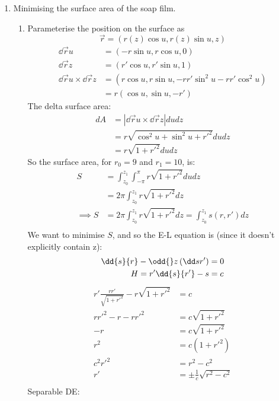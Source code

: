 \documentclass{X:/Documents/Coding/Latex/myassignment}
\begin{document}
\begin{enumerate}
\item Minimising the surface area of the soap film.
\begin{enumerate}
	\item Parameterise the position on the surface as
	\[\vec r = \left(r(z)\cos u, r(z)\sin u, z\right)\]
	\begin{align*}
		\dd{\vec r}{u} &= \left(-r\sin u, r \cos u, 0\right)\\
		\dd{\vec r}{z} &= \left(r'\cos u, r'\sin u,1\right)\\
		\dd{\vec r}{u} \times \dd{\vec r}{z} &= \left(r\cos u, r\sin u, -rr' \sin^2 u - rr' \cos^2 u\right)\\
		&=r(\cos u, \sin u, -r')
	\end{align*}
	The delta surface area:
	\begin{align*}
		dA &= \left|\dd{\vec r}{u} \times \dd{\vec r}{z}\right| du dz\\
		&= r\sqrt{\cos^2 u + \sin^2 u + r'^2} du dz\\
		&= r \sqrt{1 + r'^2} du dz
	\end{align*}
	So the surface area, for $r_0 = 9$ and $r_1 = 10$, is: 
	\begin{align*}
		S &= \int_{z_0}^{z_1} \int_{-\pi}^{\pi}  r \sqrt{1 + r'^2} du dz\\
		&= 2\pi \int_{z_0}^{z_1}  r \sqrt{1 + r'^2} dz\\
		\implies S &= 2\pi \int_{z_0}^{z_1} r\sqrt{1 + r'^2} dz = \int_{z_0}^{z_1} s(r,r') dz\\
	\end{align*}
	We want to minimise $S$, and so the E-L equation is (since it doesn't explicitly contain z):
	\begin{align*}
		\dd{s}{r} &- \odd{}z \left(\dd s{r'}\right) = 0\\
		H &=r' \dd{s}{r'} - s = c\\
	\end{align*}
	\begin{align*}
	r'\frac{r r'}{\sqrt{1+r'^2}} - r\sqrt{1 + r'^2} & = c\\
	r r'^2 - r - r r'^2 &= c\sqrt{1 + r'^2}\\	
	-r &= c\sqrt{1+r'^2}\\
	r^2 &= c(1+r'^2)\\
	c^2 r'^2 &= r^2 - c^2\\
	r' &= \pm \frac{1}{c}\sqrt{r^2 - c^2}\\
	\end{align*}
	Separable DE:
	\begin{align*}

\end{align*}
\end{enumerate}
\end{enumerate}
\end{document}
